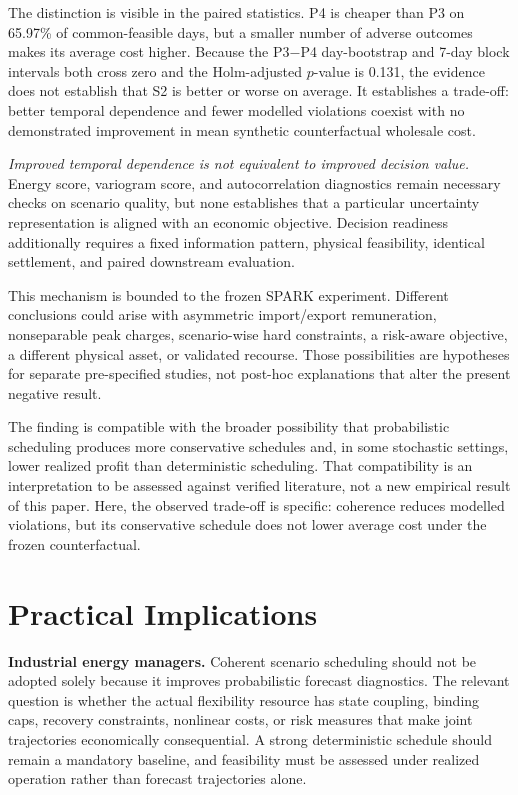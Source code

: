\documentclass[10pt,twocolumn]{article}
\begin{document}
The distinction is visible in the paired statistics. P4 is cheaper than P3 on
65.97\% of common-feasible days, but a smaller number of adverse outcomes makes
its average cost higher. Because the P3$-$P4 day-bootstrap and 7-day block
intervals both cross zero and the Holm-adjusted $p$-value is 0.131, the evidence
does not establish that S2 is better or worse on average. It establishes a
trade-off: better temporal dependence and fewer modelled violations coexist
with no demonstrated improvement in mean synthetic counterfactual wholesale
cost.

\emph{Improved temporal dependence is not equivalent to improved decision
value.} Energy score, variogram score, and autocorrelation diagnostics remain
necessary checks on scenario quality, but none establishes that a particular
uncertainty representation is aligned with an economic objective. Decision
readiness additionally requires a fixed information pattern, physical
feasibility, identical settlement, and paired downstream evaluation.

This mechanism is bounded to the frozen SPARK experiment. Different conclusions
could arise with asymmetric import/export remuneration, nonseparable peak
charges, scenario-wise hard constraints, a risk-aware objective, a different
physical asset, or validated recourse. Those possibilities are hypotheses for
separate pre-specified studies, not post-hoc explanations that alter the present
negative result.

The finding is compatible with the broader possibility that probabilistic
scheduling produces more conservative schedules and, in some stochastic
settings, lower realized profit than deterministic scheduling. That compatibility
is an interpretation to be assessed against verified literature, not a new
empirical result of this paper. Here, the observed trade-off is specific:
coherence reduces modelled violations, but its conservative schedule does not
lower average cost under the frozen counterfactual.

\section{Practical Implications}
\label{sec:implications}

\textbf{Industrial energy managers.} Coherent scenario scheduling should not
be adopted solely because it improves probabilistic forecast diagnostics. The
relevant question is whether the actual flexibility resource has state coupling,
binding caps, recovery constraints, nonlinear costs, or risk measures that make
joint trajectories economically consequential. A strong deterministic schedule
should remain a mandatory baseline, and feasibility must be assessed under
realized operation rather than forecast trajectories alone.
\end{document}
